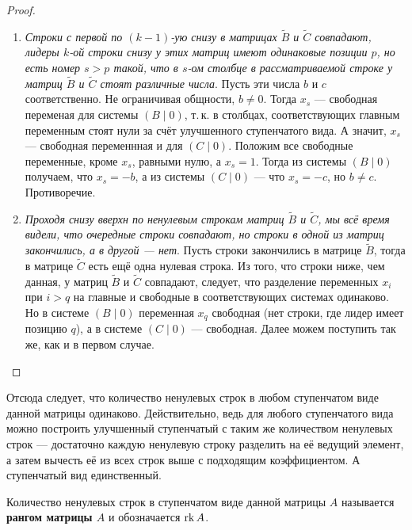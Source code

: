 \begin{proof}
\begin{enumerate}
        \item \textit{Строки с первой по $(k - 1)$-ую снизу в матрицах $\widetilde{B}$ и $\widetilde{C}$ совпадают, лидеры $k$-ой строки снизу у этих матриц имеют одинаковые позиции $p$, но есть номер $s > p$ такой, что в $s$-ом столбце в рассматриваемой строке у матриц $\widetilde{B}$ и $\widetilde{C}$ стоят различные числа}. Пусть эти числа $b$ и $c$ соответственно. Не ограничивая общности, $b \ne 0$. Тогда $x_s$ --- свободная переменая для системы $(B \mid 0)$, т.\,к. в столбцах, соответствующих главным переменным стоят нули за счёт улучшенного ступенчатого вида. А значит, $x_s$ --- свободная переменнная и для $(C \mid 0)$. Положим все свободные переменные, кроме $x_s$, равными нулю, а $x_s = 1$. Тогда из системы $(B \mid 0)$ получаем, что $x_s = -b$, а из системы $(C \mid 0)$ --- что $x_s = -c$, но $b \ne c$. Противоречие.
        \item \textit{Проходя снизу вверхн по ненулевым строкам матриц $\widetilde{B}$ и $\widetilde{C}$, мы всё время видели, что очередные строки совпадают, но строки в одной из матриц закончились, а в другой --- нет}. Пусть строки закончились в матрице $\widetilde{B}$, тогда в матрице $\widetilde{C}$ есть ещё одна нулевая строка. Из того, что строки ниже, чем данная, у матриц $\widetilde{B}$ и $\widetilde{C}$ совпадают, следует, что разделение переменных $x_i$ при $i > q$ на главные и свободные в соответствующих системах одинаково. Но в системе $(B \mid 0)$ переменная $x_q$ свободная (нет строки, где лидер имеет позицию $q$), а в системе $(C \mid 0)$ --- свободная. Далее можем поступить так же, как и в первом случае.
    \end{enumerate}
\end{proof}

\begin{orangebox}
    Отсюда следует, что количество ненулевых строк в любом ступенчатом виде данной матрицы одинаково. Действительно, ведь для любого ступенчатого вида можно построить улучшенный ступенчатый с таким же количеством ненулевых строк --- достаточно каждую ненулевую строку разделить на её ведущий элемент, а затем вычесть её из всех строк выше с подходящим коэффициентом. А ступенчатый вид единственный.
\end{orangebox}

\begin{definition}
    Количество ненулевых строк в ступенчатом виде данной матрицы $A$ называется \textbf{рангом матрицы $A$} и обозначается $\mathrm{rk}\, A$.
\end{definition}

